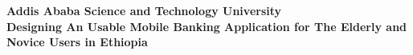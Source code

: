\documentclass[a4paper,12pt]{article}
\begin{document}
\begin{titlepage}
  \centering
  \vspace*{2cm}

  {\Large\bf Addis Ababa Science and Technology University} \\
  {\Huge\bfseries Designing An Usable Mobile Banking Application for The Elderly and Novice Users in Ethiopia}
\end{titlepage}
\end{document}
